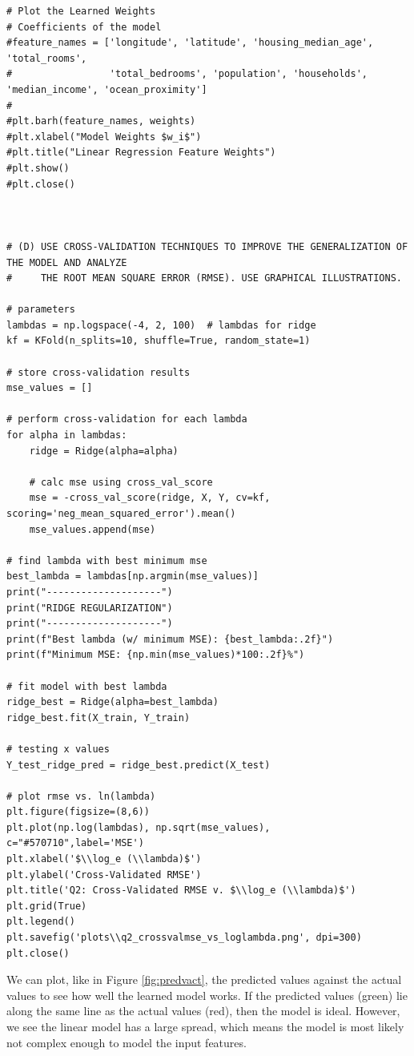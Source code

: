 \documentclass[11pt]{article}
\begin{document}
\begin{lstlisting}
# Plot the Learned Weights
# Coefficients of the model
#feature_names = ['longitude', 'latitude', 'housing_median_age', 'total_rooms', 
#                 'total_bedrooms', 'population', 'households', 'median_income', 'ocean_proximity']
#
#plt.barh(feature_names, weights)
#plt.xlabel("Model Weights $w_i$")
#plt.title("Linear Regression Feature Weights")
#plt.show()
#plt.close()



# (D) USE CROSS-VALIDATION TECHNIQUES TO IMPROVE THE GENERALIZATION OF THE MODEL AND ANALYZE
#     THE ROOT MEAN SQUARE ERROR (RMSE). USE GRAPHICAL ILLUSTRATIONS.

# parameters
lambdas = np.logspace(-4, 2, 100)  # lambdas for ridge
kf = KFold(n_splits=10, shuffle=True, random_state=1)

# store cross-validation results
mse_values = []

# perform cross-validation for each lambda
for alpha in lambdas:
    ridge = Ridge(alpha=alpha)

    # calc mse using cross_val_score
    mse = -cross_val_score(ridge, X, Y, cv=kf, scoring='neg_mean_squared_error').mean()
    mse_values.append(mse)

# find lambda with best minimum mse
best_lambda = lambdas[np.argmin(mse_values)]
print("--------------------")
print("RIDGE REGULARIZATION")
print("--------------------")
print(f"Best lambda (w/ minimum MSE): {best_lambda:.2f}")
print(f"Minimum MSE: {np.min(mse_values)*100:.2f}%")

# fit model with best lambda
ridge_best = Ridge(alpha=best_lambda)
ridge_best.fit(X_train, Y_train)

# testing x values
Y_test_ridge_pred = ridge_best.predict(X_test)

# plot rmse vs. ln(lambda)
plt.figure(figsize=(8,6))
plt.plot(np.log(lambdas), np.sqrt(mse_values), c="#570710",label='MSE')
plt.xlabel('$\\log_e (\\lambda)$')
plt.ylabel('Cross-Validated RMSE')
plt.title('Q2: Cross-Validated RMSE v. $\\log_e (\\lambda)$')
plt.grid(True)
plt.legend()
plt.savefig('plots\\q2_crossvalmse_vs_loglambda.png', dpi=300)
plt.close()
\end{lstlisting}

\bigskip
We can plot, like in Figure \ref{fig:predvact}, the predicted values against the actual values to see how well the learned model works. If the predicted values (green) lie along the same line as the actual values (red), then the model is ideal. However, we see the linear model has a large spread, which means the model is most likely not complex enough to model the input features.
\end{document}

